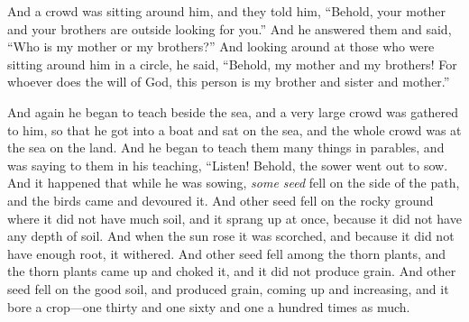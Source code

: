 \begin{biblechapter}
\verse And a crowd was sitting around him, and they told him, “Behold, your mother and your brothers are outside looking for you.”
\verse And he answered them and said, “Who is my mother or my brothers?”
\verse And looking around at those who were sitting around him in a circle, he said, “Behold, my mother and my brothers!
\verse For whoever does the will of God, this person is my brother and sister and mother.”
\end{biblechapter}

\begin{biblechapter} %
 And again he began to teach beside the sea, and a very large crowd was gathered to him, so that he got into a boat and sat on the sea, and the whole crowd was at the sea on the land.
\verse And he began to teach them many things in parables, and was saying to them in his teaching,
\verse “Listen! Behold, the sower went out to sow.
\verse And it happened that while he was sowing, \textit{some seed} fell on the side of the path, and the birds came and devoured it.
\verse And other seed fell on the rocky ground where it did not have much soil, and it sprang up at once, because it did not have any depth of soil.
\verse And when the sun rose it was scorched, and because it did not have enough root, it withered.
\verse And other seed fell among the thorn plants, and the thorn plants came up and choked it, and it did not produce grain.
\verse And other seed fell on the good soil, and produced grain, coming up and increasing, and it bore a crop—one thirty and one sixty and one a hundred times as much.

\end{biblechapter}
